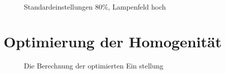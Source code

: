 \documentclass[a4paper,bibtotoc,oneside]{scrbook}
\begin{document}
\begin{figure} [htbp]
\caption{Standardeinstellungen 80\%, Lampenfeld hoch}
\label{h80}
\end{figure}

\FloatBarrier

\section{Optimierung der Homogenität}

\begin{figure} [htbp]
\caption{Die Berechnung der optimierten Ein stellung}
\label{optb}
\end{figure} 
\end{document}
